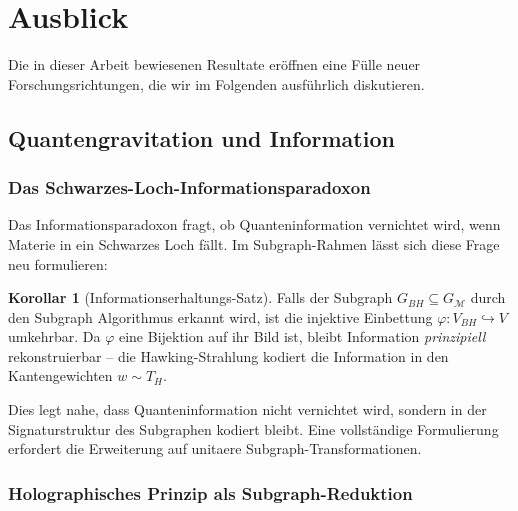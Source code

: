 ﻿\documentclass[a4paper,12pt]{article}
\theoremstyle{definition}
\newtheorem{korollar}{Korollar}
\begin{document}
\section{Ausblick}

Die in dieser Arbeit bewiesenen Resultate er\"offnen eine F\"ulle neuer
Forschungsrichtungen, die wir im Folgenden ausf\"uhrlich diskutieren.

\subsection{Quantengravitation und Information}

\subsubsection{Das Schwarzes-Loch-Informationsparadoxon}

Das Informationsparadoxon \cite{hawking1976} fragt, ob Quanteninformation
vernichtet wird, wenn Materie in ein Schwarzes Loch f\"allt. Im
Subgraph-Rahmen l\"asst sich diese Frage neu formulieren:

\begin{korollar}[Informationserhaltungs-Satz]
	Falls der Subgraph $G_{BH} \subseteq G_{\mathcal{M}}$ durch den
	Subgraph Algorithmus erkannt wird, ist die injektive Einbettung
	$\varphi: V_{BH} \hookrightarrow V$ umkehrbar. Da $\varphi$ eine
	Bijektion auf ihr Bild ist, bleibt Information \emph{prinzipiell}
	rekonstruierbar -- die Hawking-Strahlung kodiert die Information
	in den Kantengewichten $w \sim T_H$.
\end{korollar}

Dies legt nahe, dass Quanteninformation nicht vernichtet wird, sondern
in der Signaturstruktur des Subgraphen kodiert bleibt. Eine vollst\"andige
Formulierung erfordert die Erweiterung auf unitaere Subgraph-Transformationen.

\subsubsection{Holographisches Prinzip als Subgraph-Reduktion}
\end{document}
